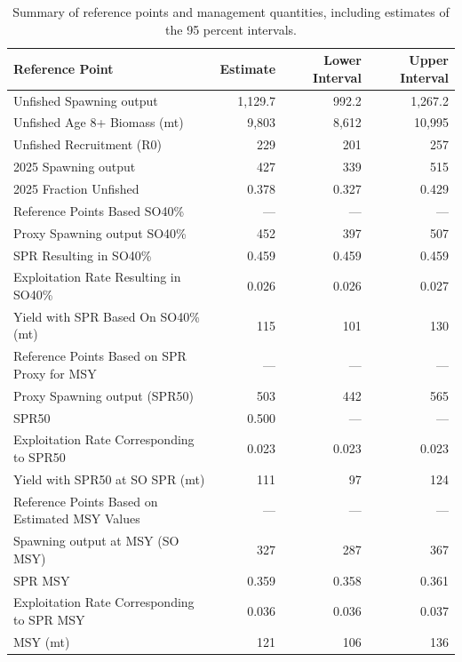 \documentclass[
]{scrartcl}
\begin{document}
\begin{longtable}{lrrr}

\caption{\label{tbl-ref-points-es-1}Summary of reference points and
management quantities, including estimates of the 95 percent intervals.}

\tabularnewline

\toprule
Reference Point & Estimate & Lower Interval & Upper Interval \\ 
\midrule\addlinespace[2.5pt]
Unfished Spawning output & 1,129.7 & 992.2 & 1,267.2 \\ 
Unfished Age 8+ Biomass (mt) & 9,803 & 8,612 & 10,995 \\ 
Unfished Recruitment (R0) & 229 & 201 & 257 \\ 
2025 Spawning output & 427 & 339 & 515 \\ 
2025 Fraction Unfished & 0.378 & 0.327 & 0.429 \\ 
Reference Points Based SO40\% & — & — & — \\ 
Proxy Spawning output SO40\% & 452 & 397 & 507 \\ 
SPR Resulting in SO40\% & 0.459 & 0.459 & 0.459 \\ 
Exploitation Rate Resulting in SO40\% & 0.026 & 0.026 & 0.027 \\ 
Yield with SPR Based On SO40\% (mt) & 115 & 101 & 130 \\ 
Reference Points Based on SPR Proxy for MSY & — & — & — \\ 
Proxy Spawning output (SPR50) & 503 & 442 & 565 \\ 
SPR50 & 0.500 & — & — \\ 
Exploitation Rate Corresponding to SPR50 & 0.023 & 0.023 & 0.023 \\ 
Yield with SPR50 at SO SPR (mt) & 111 & 97 & 124 \\ 
Reference Points Based on Estimated MSY Values & — & — & — \\ 
Spawning output at MSY (SO MSY) & 327 & 287 & 367 \\ 
SPR MSY & 0.359 & 0.358 & 0.361 \\ 
Exploitation Rate Corresponding to SPR MSY & 0.036 & 0.036 & 0.037 \\ 
MSY (mt) & 121 & 106 & 136 \\ 
\bottomrule

\end{longtable}

\endgroup
\end{document}
